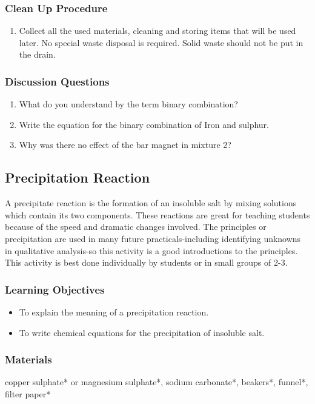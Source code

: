 \subsubsection*{Clean Up Procedure}
\begin{enumerate}
\item{Collect all the used materials, cleaning and storing items that will be used later. No special waste disposal is required. Solid waste should not be put in the drain.}
\end{enumerate}

\subsubsection*{Discussion Questions}
\begin{enumerate}
\item{What do you understand by the term binary combination?}
\item{Write the equation for the binary combination of Iron and sulphur.}
\item{Why was there no effect of the bar magnet in mixture 2?}
\end{enumerate}


\subsection{Precipitation Reaction}
A precipitate reaction is the formation of an insoluble salt by mixing solutions which contain its two components. These reactions are great for teaching students because of the speed and dramatic changes involved. The principles or precipitation are used in many future practicals-including identifying unknowns in qualitative analysis-so this activity is a good introductions to the principles. This activity is best done individually by students or in small groups of 2-3. 

\subsubsection*{Learning Objectives}
\begin{itemize}
\item{To explain the meaning of a precipitation reaction.}
\item{To write chemical equations for the precipitation of insoluble salt.}
\end{itemize}

\subsubsection*{Materials}
copper sulphate* or magnesium sulphate*, sodium carbonate*, beakers*, funnel*, filter paper*

